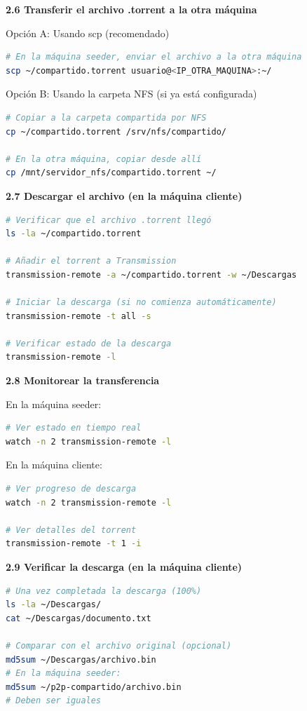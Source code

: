 \documentclass[stu, 12pt, letterpaper, donotrepeattitle, floatsintext, noapacite]{apa7}
\begin{document}
\textbf{2.6 Transferir el archivo .torrent a la otra máquina}

Opción A: Usando scp (recomendado)
\begin{lstlisting}[language=bash]
# En la máquina seeder, enviar el archivo a la otra máquina
scp ~/compartido.torrent usuario@<IP_OTRA_MAQUINA>:~/
\end{lstlisting}

Opción B: Usando la carpeta NFS (si ya está configurada)
\begin{lstlisting}[language=bash]
# Copiar a la carpeta compartida por NFS
cp ~/compartido.torrent /srv/nfs/compartido/

# En la otra máquina, copiar desde allí
cp /mnt/servidor_nfs/compartido.torrent ~/
\end{lstlisting}

\textbf{2.7 Descargar el archivo (en la máquina cliente)}
\begin{lstlisting}[language=bash]
# Verificar que el archivo .torrent llegó
ls -la ~/compartido.torrent

# Añadir el torrent a Transmission
transmission-remote -a ~/compartido.torrent -w ~/Descargas

# Iniciar la descarga (si no comienza automáticamente)
transmission-remote -t all -s

# Verificar estado de la descarga
transmission-remote -l
\end{lstlisting}

\textbf{2.8 Monitorear la transferencia}

En la máquina seeder:
\begin{lstlisting}[language=bash]
# Ver estado en tiempo real
watch -n 2 transmission-remote -l
\end{lstlisting}

En la máquina cliente:
\begin{lstlisting}[language=bash]
# Ver progreso de descarga
watch -n 2 transmission-remote -l

# Ver detalles del torrent
transmission-remote -t 1 -i
\end{lstlisting}

\textbf{2.9 Verificar la descarga (en la máquina cliente)}
\begin{lstlisting}[language=bash]
# Una vez completada la descarga (100%)
ls -la ~/Descargas/
cat ~/Descargas/documento.txt

# Comparar con el archivo original (opcional)
md5sum ~/Descargas/archivo.bin
# En la máquina seeder:
md5sum ~/p2p-compartido/archivo.bin
# Deben ser iguales
\end{lstlisting}
\end{document}
